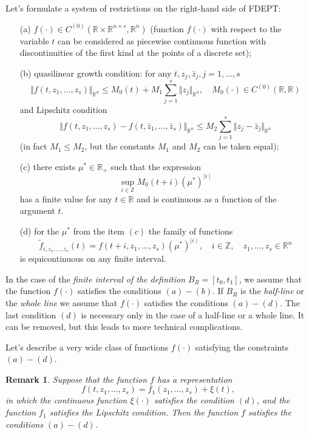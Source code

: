 \documentclass[
11pt,%
tightenlines,%
twoside,%
onecolumn,%
nofloats,%
nobibnotes,%
nofootinbib,%
superscriptaddress,%
noshowpacs,%
centertags,aps]%
{revtex4}
\newtheorem{remark}{Remark}
\begin{document}
Let's formulate a system of restrictions on the right-hand side of FDEPT:
\begin{itemize}
\item [(a)] $f(\cdot)\in C^{(0)}(\mathbb R\times\mathbb R^{n\times s},\mathbb R^n)$ (function $f(\cdot)$ with respect to the variable $t$ can be considered as piecewise continuous function with discontinuities of the first kind at the points of a discrete set);
\item [(b)] quasilinear growth condition: for any $t, z_j,\bar z_j,j=1,\ldots,s$
\[
\Vert f\left(t,z_1,\ldots,z_s\right)\Vert_{\mathbb R^n}\le M_0(t)+M_1\sum_{j=1}^s \Vert z_j\Vert_{\mathbb R^n},\quad M_0(\cdot)\in C^{(0)}(\mathbb R,\mathbb R)
\]
and Lipschitz condition
\[
\Vert f\left(t,z_1,\ldots,z_s\right)-f\left(t,\bar z_1,\ldots,\bar z_s\right)\Vert_{\mathbb R^n}\le M_2\sum_{j=1}^s \Vert z_j-\bar z_j\Vert_{\mathbb R^n}
\]
(in fact $M_1\leq M_2$, but the constants $M_1$ and $M_2$ can be taken equal);
\item [(c)] there exists $\mu^*\in \mathbb R_+$ such that the expression
\[
\sup_{i\in \mathbb Z} M_0(t+i)\left({\mu}^*\right)^{\mid i\mid}
\]
has a finite value for any $t\in \mathbb R$ and is continuous as a function of the argument $t$.
\item [(d)] for the $\mu^*$ from the item $(c)$ the family of functions
\[
\tilde f_{i,z_1,\ldots,z_s}(t)=f(t+i,z_1,\ldots,z_s)(\mu^*)^{\mid i\mid},\quad i\in \mathbb Z,\quad z_1,\ldots,z_s\in \mathbb R^{n}
\]
is equicontinuous on any finite interval.
\end{itemize}

In the case of the {\it finite interval of the definition} $B_R=[t_0,t_1]$, we assume that the function $f(\cdot)$ satisfies the conditions $(a)-(b)$. If $B_R$ is the {\it half-line} or the {\it whole line} we assume that $f(\cdot)$ satisfies the conditions $(a)-(d)$. The last condition $(d)$ is necessary only in the case of a half-line or a whole line. It can be removed, but this leads to more technical complications.

Let's describe a very wide class of functions $f(\cdot)$ satisfying the constraints $(a)-(d)$.
\begin{remark}
Suppose that the function $f$ has a representation
\[
f(t,z_1,\ldots,z_s)=f_1(z_1,\ldots,z_s)+\xi(t),
\]
in which the continuous function $\xi(\cdot)$ satisfies the condition $(d)$, and the function $f_1$ satisfies the Lipschitz condition. Then the function $f$ satisfies the conditions $(a)-(d)$.
\end{remark}
\end{document}
